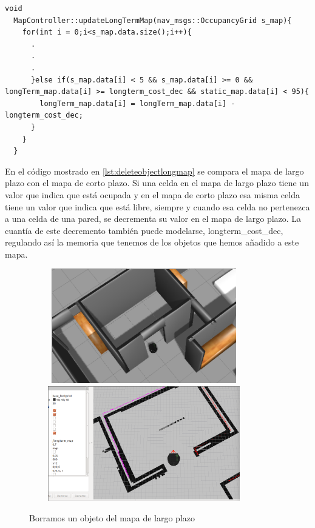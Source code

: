 \begin{lstlisting}[caption=Procedimiento para eliminar un objeto al mapa de largo plazo, label={lst:deleteobjectlongmap}]
  void
  MapController::updateLongTermMap(nav_msgs::OccupancyGrid s_map){
    for(int i = 0;i<s_map.data.size();i++){
      .
      .
      .
      }else if(s_map.data[i] < 5 && s_map.data[i] >= 0 && longTerm_map.data[i] >= longterm_cost_dec && static_map.data[i] < 95){
        longTerm_map.data[i] = longTerm_map.data[i] - longterm_cost_dec;
      }
    }
  } 

\end{lstlisting}

En el código mostrado en \ref{lst:deleteobjectlongmap} se compara el mapa de largo plazo con el mapa de corto plazo. Si una celda en el mapa de largo plazo tiene un valor que indica que está ocupada y en el mapa de corto plazo esa misma celda tiene un valor que indica que está libre, siempre y cuando esa celda no pertenezca a una celda de una pared, se decrementa su valor en el mapa de largo plazo. La cuantía de este decremento también puede modelarse, longterm\_cost\_dec, regulando así la memoria que tenemos de los objetos que hemos añadido a este mapa.\\

\begin{figure}[H]
  \begin{center}
    \includegraphics[width=10cm,height=5cm]{img/cap4/deletingobject-gazebo}
    \includegraphics[width=10cm,height=5cm]{img/cap4/deletingobject-longmap}
  \end{center}
  \caption{Borramos un objeto del mapa de largo plazo}
  \label{fig:deleteobjectlongmap}
\end{figure}

